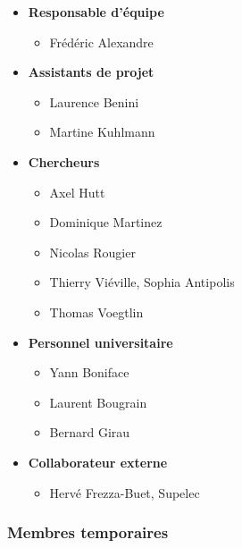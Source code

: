 \setlength{\columnseprule}{0.4pt}
\begin{multicols}{2}
\begin{itemize}
   \item \textbf{Responsable d'équipe}
      \begin{itemize}
         \item Frédéric Alexandre
      \end{itemize}
   \item \textbf{Assistants de projet}
      \begin{itemize}
         \item Laurence Benini
         \item Martine Kuhlmann 
      \end{itemize}
   \item \textbf{Chercheurs}
      \begin{itemize}
         \item Axel Hutt
         \item Dominique Martinez
         \item Nicolas Rougier
         \item Thierry Viéville, Sophia Antipolis
         \item Thomas Voegtlin 
      \end{itemize}
   \item \textbf{Personnel universitaire}
      \begin{itemize}
         \item Yann Boniface
         \item Laurent Bougrain
         \item Bernard Girau
      \end{itemize}
   \item \textbf{Collaborateur externe}
      \begin{itemize}
         \item Hervé Frezza-Buet, Supelec
      \end{itemize}
\end{itemize}
\end{multicols}


\subsubsection{Membres temporaires} %
\label{ssub:Membres temporaires}

